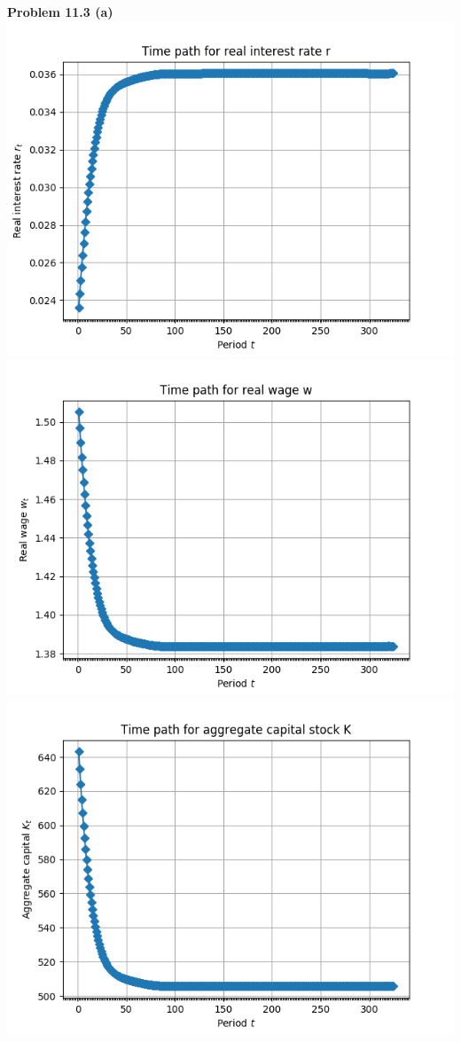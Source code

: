 \documentclass[letterpaper,12pt]{article}
\theoremstyle{definition}
\begin{document}
\noindent\textbf{Problem 11.3 (a)}\\
\includegraphics[scale=0.5]{images/rpath.png}
\includegraphics[scale=0.5]{images/wpath.png}
\includegraphics[scale=0.5]{images/Kpath.png}
\end{document}
